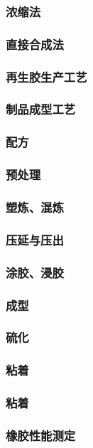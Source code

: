 \documentclass[UTF8]{../../ApplicationUniverse}
\begin{document}
            \subsubsection{浓缩法}
            \subsubsection{直接合成法}
        \subsubsection{再生胶生产工艺}
    \subsubsection{制品成型工艺}
        \subsubsection{配方}
        \subsubsection{预处理}
        \subsubsection{塑炼、混炼}
        \subsubsection{压延与压出}
        \subsubsection{涂胶、浸胶}
        \subsubsection{成型}
        \subsubsection{硫化}
        \subsubsection{粘着}
        \subsubsection{粘着}
    \subsubsection{橡胶性能测定}
\end{document}
